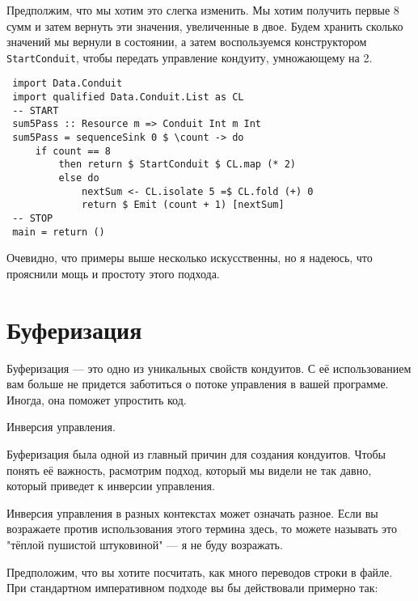 Предполжим, что мы хотим это слегка изменить. Мы хотим получить первые 8 сумм и 
затем вернуть эти значения, увеличенные в двое. Будем хранить сколько значений 
мы вернули в состоянии, а затем воспользуемся конструктором 
\lstinline'StartConduit', чтобы передать управление кондуиту, умножающему на 2.
\begin{lstlisting}
 import Data.Conduit
 import qualified Data.Conduit.List as CL
 -- START
 sum5Pass :: Resource m => Conduit Int m Int
 sum5Pass = sequenceSink 0 $ \count -> do
     if count == 8
         then return $ StartConduit $ CL.map (* 2)
         else do
             nextSum <- CL.isolate 5 =$ CL.fold (+) 0
             return $ Emit (count + 1) [nextSum]
 -- STOP
 main = return ()
\end{lstlisting}
Очевидно, что примеры выше несколько искусственны, но я надеюсь, что прояснили 
мощь и простоту этого подхода. 
 
\section{Буферизация}

Буферизация --- это одно из уникальных свойств кондуитов. С её использованием 
вам больше не придется заботиться о потоке управления в вашей программе.
Иногда, она поможет упростить код.

Инверсия управления.

Буферизация была одной из главный причин для создания кондуитов. Чтобы понять её 
важность, расмотрим подход, который мы видели не так давно, который приведет к 
инверсии управления.

Инверсия управления в разных контекстах может означать разное. Если вы возражаете 
против использования этого термина здесь, то можете называть это 
"тёплой пушистой штуковиной" --- я не буду возражать.

Предположим, что вы хотите посчитать, как много переводов строки в файле. При 
стандартном императивном подходе вы бы действовали примерно так:

